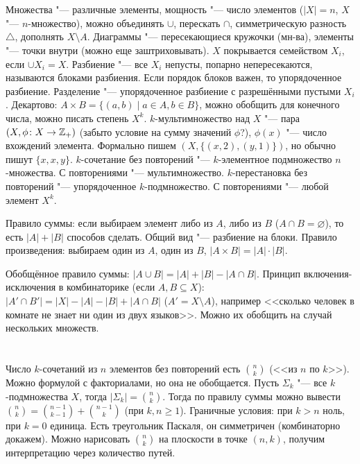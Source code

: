 \section{} %
Множества "--- различные элементы, мощность "--- число элементов ($|X|=n$, $X$ "--- $n$-множество),
можно объединять $\cup$, перескать $\cap$, симметрическую разность $\triangle$, дополнять $X \setminus A$.
Диаграммы "--- пересекающиеся кружочки (мн-ва), элементы "--- точки внутри (можно еще заштриховывать).
$X$ покрывается семейством $X_i$, если $\cup X_i=X$.
Разбиение "--- все $X_i$ непусты, попарно непересекаются, называются блоками разбиения.
Если порядок блоков важен, то упорядоченное разбиение.
Разделение "--- упорядоченное разбиение с разрешёнными пустыми $X_i$.
Декартово: $A \times B = \{(a,b) \mid a \in A, b \in B\}$, можно обобщить для конечного числа,
можно писать степень $X^{k}$.
$k$-мультимножество над $X$ "--- пара $(X, \phi \colon X \to \mathbb{Z}_{+})$ (\TODO забыто условие на сумму значений $\phi$?),
$\phi(x)$ "--- число вхождений элемента.
Формально пишем $(X, \{(x, 2), (y, 1)\})$, но обычно пишут $\{x, x, y\}$.
$k$-сочетание без повторений "--- $k$-элементное подмножество $n$-множества.
С повторениями "--- мультимножество.
$k$-перестановка без повторений "--- упорядоченное $k$-подмножество.
С повторениями "--- любой элемент $X^{k}$.

Правило суммы: если выбираем элемент либо из $A$, либо из $B$ ($A \cap B=\varnothing$), то есть
$|A|+|B|$ способов сделать.
Общий вид "--- разбиение на блоки.
Правило произведения: выбираем один из $A$, один из $B$, $|A \times B| = |A| \cdot |B|$.

Обобщённое правило суммы: $|A\cup B|=|A|+|B|-|A\cap B|$.
Принцип включения-исключения в комбинаторике (если $A, B\subseteq X$): $|A'\cap B'|=|X|-|A|-|B|+|A\cap B|$ ($A'=X\setminus A$),
например <<сколько человек в комнате не знает ни один из двух языков>>.
Можно их обобщить на случай нескольких множеств.

\section{} %
Число $k$-сочетаний из $n$ элементов без повторений есть $\binom{n}{k}$ (<<из $n$ по $k$>>).
Можно формулой с факториалами, но она не обобщается.
Пусть $\Sigma_k$ "--- все $k$-подмножества $X$, тогда $|\Sigma_k|=\binom{n}{k}$.
Тогда по правилу суммы можно вывести $\binom{n}{k}=\binom{n-1}{k-1}+\binom{n-1}{k}$ (при $k, n \ge 1$).
Граничные условия: при $k>n$ ноль, при $k=0$ единица.
Есть треугольник Паскаля, он симметричен (комбинаторно докажем).
Можно нарисовать $\binom{n}{k}$ на плоскости в точке $(n, k)$, получим интерпретацию через количество путей.

